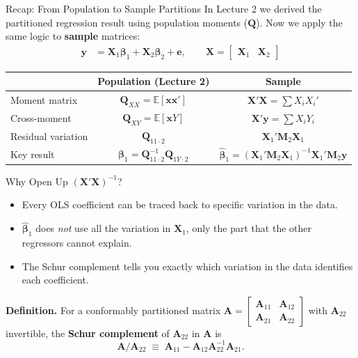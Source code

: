 \documentclass[aspectratio=169, handout, t]{beamer}
\numberwithin{equation}{section}
\begin{document}
\begin{frame}{Recap: From Population to Sample Partitions}
In Lecture 2 we derived the partitioned regression result using population moments ($\mathbf{Q}$).
Now we apply the same logic to \textbf{sample} matrices:\pause
\begin{align*}
\bm{y}&=\bm{X}_1\bm{\beta}_1+\bm{X}_2\bm{\beta}_2+\bm{e},\qquad
\bm{X}=\begin{bmatrix}\bm{X}_1& \bm{X}_2\end{bmatrix}
\end{align*}\pause
\begin{center}
\renewcommand{\arraystretch}{1.4}
\begin{tabular}{lcc}
& \textbf{Population (Lecture 2)} & \textbf{Sample}\\
\hline
Moment matrix & $\mathbf{Q}_{XX}=\mathbb{E}[\bm{x}\bm{x}']$ & $\bm{X}'\bm{X}=\sum X_iX_i'$\\
Cross-moment & $\mathbf{Q}_{XY}=\mathbb{E}[\bm{x}Y]$ & $\bm{X}'\bm{y}=\sum X_iY_i$\\
Residual variation & $\mathbf{Q}_{11\cdot 2}$ & $\bm{X}_1'\bm{M}_2\bm{X}_1$\\
Key result & $\bm{\beta}_1=\mathbf{Q}_{11\cdot 2}^{-1}\mathbf{Q}_{1Y\cdot 2}$
  & $\hat{\bm{\beta}}_1=(\bm{X}_1'\bm{M}_2\bm{X}_1)^{-1}\bm{X}_1'\bm{M}_2\bm{y}$
\end{tabular}
\end{center}
\end{frame}


\begin{frame}{Why Open Up $(\bm{X}'\bm{X})^{-1}$?}
\begin{itemize}
\item Every OLS coefficient can be traced back to specific variation in the data.\pause
\item $\bm{\hat{\beta}}_1$ does \emph{not} use all the variation in $\bm{X}_1$, only the part that the other regressors cannot explain.\pause
\item \alert{The Schur complement tells you exactly which variation in the data identifies each coefficient.}
\end{itemize}
\pause
\begin{tcolorbox}[colback=blue!5, colframe=blue!50, boxsep=2pt, top=2pt, bottom=2pt]
\textbf{Definition.} For a conformably partitioned matrix
$\bm{A}=\begin{bmatrix}\bm{A}_{11}&\bm{A}_{12}\\\bm{A}_{21}&\bm{A}_{22}\end{bmatrix}$
with $\bm{A}_{22}$ invertible, the \textbf{Schur complement} of $\bm{A}_{22}$ in $\bm{A}$ is
$$\bm{A}/\bm{A}_{22}\;\equiv\;\bm{A}_{11}-\bm{A}_{12}\bm{A}_{22}^{-1}\bm{A}_{21}.$$
\end{tcolorbox}
\end{frame}
\end{document}

